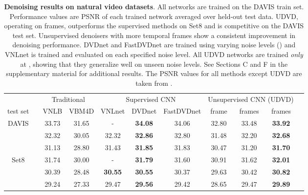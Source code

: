 \documentclass[final]{cvpr}
\begin{document}
\begin{table*}[ht]
    \centering
    \footnotesize{
    \begin{tabular}{ccccccccccc}
        \toprule

        \multicolumn{1}{l}{\phantom} &
        \multicolumn{1}{l}{\phantom} &
        \multicolumn{2}{c}{Traditional}    &
        \multicolumn{3}{c}{Supervised CNN}   &
        \multicolumn{3}{c}{Unsupervised CNN (UDVD)}    \\ 
        \cmidrule(lr){3-4}
        \cmidrule(lr){5-7}
        \cmidrule(lr){8-10}
        
         \multicolumn{1}{c}{test set} &
        \multicolumn{1}{c}{} &
        \multicolumn{1}{c}{VNLB } &
        \multicolumn{1}{c}{VBM4D}     &
        \multicolumn{1}{c}{VNLnet} &
        \multicolumn{1}{c}{DVDnet} &
        \multicolumn{1}{c}{FastDVDnet} & 
        \multicolumn{1}{c}{ frame} & 
        \multicolumn{1}{c}{ frames} & 
        \multicolumn{1}{c}{ frames} \\
        
        
        \midrule
        \multirow{3}{*}{DAVIS} 
        &  & 33.73 & 31.65 & -     & \textbf{34.08} & 34.06 & 32.80 & 33.48 & \textbf{33.92} \\
        &  & 32.32 & 30.05 & 32.32 & \textbf{32.86} & 32.80 & 31.48 & 32.20 & \textbf{32.68} \\
        &  & 31.13 & 28.80 & 31.43 & \textbf{31.85} & 31.83 & 30.47 & 31.20 & \textbf{31.70} \\
        \midrule
        \multirow{3}{*}{Set8} 
        &  & 31.74 & 30.00 & -     & \textbf{31.79} & 31.60 & 30.91 & 31.62 & \textbf{32.01} \\
        &  & 30.39 & 28.48 & \textbf{30.55} & \textbf{30.55} & 30.37 & 29.63 & 30.42 & \textbf{30.82} \\
        &  & 29.24 & 27.33 & 29.47 & \textbf{29.56} & 29.42 & 28.65 & 29.47 & \textbf{29.89} \\
        \bottomrule
    \end{tabular}
    }
    \vspace{0.3cm}
    \caption{\textbf{Denoising results on natural video datasets}. All networks are trained on the DAVIS train set. Performance values are PSNR of each trained network averaged over held-out test data. UDVD, operating on  frames, outperforms the supervised methods on Set8 and is competitive on the DAVIS test set.  Unsupervised denoisers with more temporal frames show a consistent improvement in denoising performance. DVDnet and FastDVDnet are trained using varying noise levels () and VNLnet is trained and evaluated on each specified noise level. All UDVD networks are trained \emph{only} at , showing that they generalize well on unseen noise levels. See Sections C and F in the supplementary material for additional results. The PSNR values for all methods except UDVD are taken from \cite{fastdvdnet}.}
    \label{tab:test_data}
\end{table*}
\end{document}
